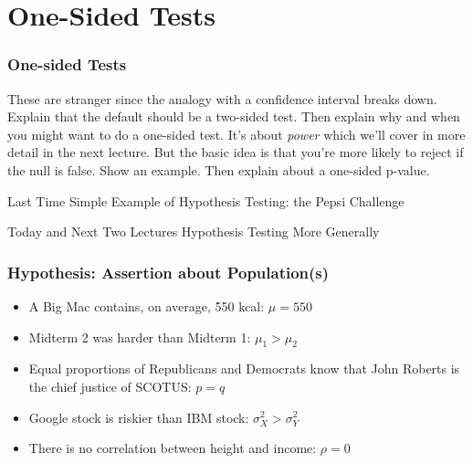 \section{One-Sided Tests}
\begin{frame}
  \frametitle{One-sided Tests} 
  These are stranger since the analogy with a confidence interval breaks down.
  Explain that the default should be a two-sided test.
  Then explain why and when you might want to do a one-sided test.
  It's about \emph{power} which we'll cover in more detail in the next lecture. 
  But the basic idea is that you're more likely to reject if the null is false.
  Show an example.
  Then explain about a one-sided p-value.
\end{frame}
\begin{frame}
\begin{block}{Last Time}
Simple Example of Hypothesis Testing: the Pepsi Challenge
\end{block}

\begin{block}{Today and Next Two Lectures}
Hypothesis Testing More Generally
\end{block}

\end{frame}

\begin{frame}
\frametitle{Hypothesis: Assertion about Population(s)}
	\begin{itemize}
	\item A Big Mac contains, on average, 550 kcal: \alert{$\mu = 550$}
	\item Midterm 2 was harder than Midterm 1: \alert{$\mu_{1} >\mu_2$}
	\item Equal proportions of Republicans and Democrats know that John Roberts is the chief justice of SCOTUS: \alert{$p = q$}
	\item Google stock is riskier than IBM stock: \alert{$\sigma^2_{X} > \sigma^2_{Y}$}
	\item There is no correlation between height and income: \alert{$\rho = 0$} 
	\end{itemize}
\end{frame}

